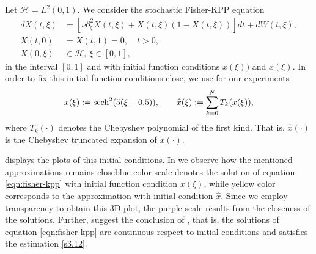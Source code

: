 Let $\mathcal{H} = L^2 (0,1)$. We consider the stochastic Fisher-KPP 
    equation 
    \begin{equation}
        \label{eqn:fisher-kpp}
        \begin{aligned}
            d X(t, \xi) &= 
                \left[
                    \nu 
                    \partial_{\xi} ^ 2 X(t, \xi)
                    +
                    X(t, \xi) (1 -X(t, \xi) )
                \right]
                dt
                +
                dW(t, \xi),
            \\
            X(t, 0) &= X(t, 1) =0, \quad t>0, 
            \\
            X(0, \xi) & \in 
            \mathcal{H}, \ \xi \in [0, 1],
        \end{aligned}
    \end{equation}
    in the interval $[0, 1]$ and with initial function conditions
    $x(\xi))$ and  $\widehat{x}(\xi)$. In order to fix this initial function 
    conditions  close, we use for our experiments
    \begin{equation}
        x(\xi) := \operatorname{sech} ^ 2( 5  (\xi - 0.5)),
        \qquad
        \widehat{x}(\xi) :=
            \sum_{k=0} ^ N
             T_k(x(\xi)),
    \end{equation}
    where $T_k(\cdot)$ denotes the Chebyshev polynomial of the first kind. That 
    is, $\widehat{x}(\cdot)$ is the Chebyshev truncated expansion of $x(\cdot)$.
    
     displays the 
    plots of this initial conditions. In  we 
    observe how the mentioned approximations remains close\textemdash blue
    color scale denotes the solution of equation \ref{eqn:fisher-kpp}
    with initial function condition $x(\xi)$, while yellow color corresponds 
    to the approximation with initial condition $\widehat{x}$. Since we employ
    transparency to obtain this 3D plot, the  purple scale results from the 
    closeness of the solutions. Further,   suggest the 
    conclusion of , that is, the solutions of equation
    \eqref{eqn:fisher-kpp} are continuous respect to initial conditions and 
    satisfies the estimation \eqref{s3.12}.

